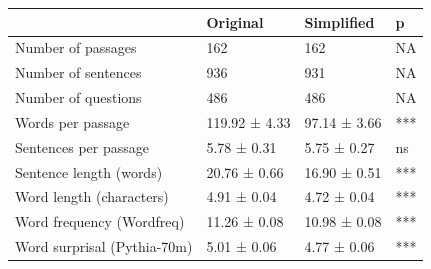 \begin{tabular}{@{}llll@{}}
\toprule
      & \textbf{Original} & \textbf{Simplified} & \textbf{p} \\ \midrule
Number of passages  &  162 & 162 & NA \\ 
Number of sentences  &  936 & 931 & NA \\
Number of questions  &  486 & 486 & NA \\ \midrule
Words per passage  &  119.92 ± 4.33 & 97.14 ± 3.66 & *** \\
Sentences per passage  &  5.78 ± 0.31 & 5.75 ± 0.27 & ns \\
Sentence length (words)  &  20.76 ± 0.66 & 16.90 ± 0.51 & *** \\ \midrule
Word length (characters)  &  4.91 ± 0.04 & 4.72 ± 0.04 & *** \\
Word frequency (Wordfreq)  &  11.26 ± 0.08 & 10.98 ± 0.08 & *** \\
Word surprisal (Pythia-70m)  &  5.01 ± 0.06 & 4.77 ± 0.06 & *** \\
\bottomrule
\end{tabular}